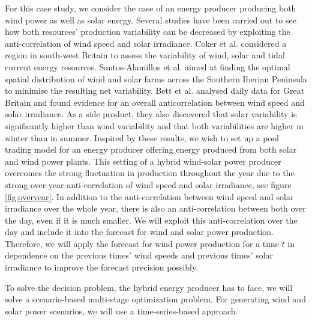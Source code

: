 For this case study, we consider the case of an energy producer producing both wind power as well as solar energy. Several studies have been carried out to see how both resources' production variability  can be decreased by exploiting the anti-correlation of wind speed and solar irradiance. Coker et al. \cite{Coker2013} considered a region in south-west Britain to assess the variability of wind, solar and tidal current energy resources. Santos-Alamillos et al. \cite{Santos-Alamillos} aimed at finding the optimal spatial distribution of wind and solar farms across the Southern Iberian Peninsula to minimise the resulting net variability. Bett et al. \cite{BETT16} analysed daily data for Great Britain and found  evidence for an overall anticorrelation between wind speed and solar irradiance. As a side product, they also discovered that solar variability is significantly higher than wind variability and that both variabilities are higher in winter than in summer. Inspired by these results, we wish to set up a pool trading model for an energy producer offering energy produced from both solar and wind power plants.  
This setting of a hybrid wind-solar power producer
	overcomes the strong fluctuation in production throughout the year due to the strong over year anti-correlation of wind speed and solar irradiance, see figure \ref{fig:overyear}. In addition to
	the anti-correlation between wind speed and solar irradiance over the whole year, there is also an anti-correlation between both over the day, even if it is much smaller. We will exploit this anti-correlation over the day and include it into the forecast
	for wind and solar power production. Therefore, we will apply the forecast for wind power production for a time $t$ in dependence on the previous times' wind speeds and previous times' solar irradiance to improve the forecast precision possibly.
	
	To solve the  decision problem, the hybrid energy producer has to face, we will solve a scenario-based multi-stage optimization problem. For generating wind and solar power scenarios, we will use a time-series-based approach.  

